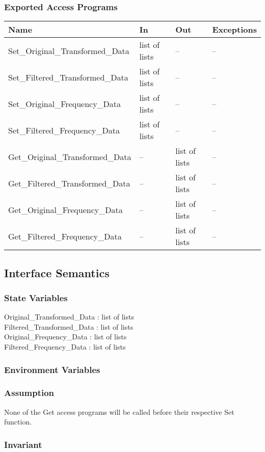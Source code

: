 \documentclass[12pt]{article}
\begin{document}
\subsubsection{Exported Access Programs}
\begin{center}
\begin{tabular}{l l l l}
\hline
\textbf{Name} & \textbf{In} & \textbf{Out} & \textbf{Exceptions} \\ \hline
Set\_Original\_Transformed\_Data &  list of lists & -- & 
-- \\
Set\_Filtered\_Transformed\_Data &  list of lists & -- & 
-- \\
Set\_Original\_Frequency\_Data &  list of lists & -- & 
-- \\
Set\_Filtered\_Frequency\_Data &  list of lists & -- & 
-- \\
Get\_Original\_Transformed\_Data &  -- & list of lists & 
-- \\
Get\_Filtered\_Transformed\_Data &  -- & list of lists & 
-- \\
Get\_Original\_Frequency\_Data &  -- & list of lists & 
-- \\
Get\_Filtered\_Frequency\_Data &  -- & list of lists & 
-- \\
\hline
\end{tabular}
\end{center}
\subsection{Interface Semantics}
\subsubsection{State Variables}
Original\_Transformed\_Data : list of lists\\
Filtered\_Transformed\_Data : list of lists\\
Original\_Frequency\_Data : list of lists\\
Filtered\_Frequency\_Data : list of lists
\subsubsection{Environment Variables}
\subsubsection{Assumption}
None of the Get access programs will be called before their respective
Set function.
\subsubsection{Invariant}
\end{document}
